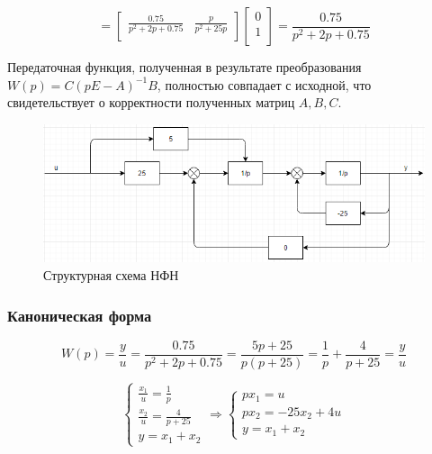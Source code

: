 \documentclass[14pt,a4paper,report]{report}
\begin{document}
\begin{equation*}
\text{$=\begin{bmatrix}
\frac{0.75}{p^2+2p+0.75} & \frac{p}{p^2+25p} \\
\end{bmatrix}\begin{bmatrix}
0\\
1 \\
\end{bmatrix}=\frac{0.75}{p^2+2p+0.75}
$}
\end{equation*}

Передаточная функция, полученная в результате преобразования $W(p)=C(pE-A)^{-1}B$, полностью совпадает с исходной, что свидетельствует о корректности полученных матриц  $A, B, C$. 


\begin{figure}[h!]
	\centering
	\includegraphics[scale = 0.9]{images/nfn.png}
	\caption{Структурная схема НФН}
	\label{image:2}
\end{figure}
\newpage
\subsubsection{Каноническая форма}

\begin{equation*}
\text{$W(p)=\frac{y}{u}=\frac{0.75}{p^2+2p+0.75}=\frac{5p+25}{p(p+25)}=\frac{1}{p}+\frac{4}{p+25}=\frac{y}{u}$}
\end{equation*}

\begin{equation*}
\begin{cases}
	\text{$\frac{x_1}{u}=\frac{1}{p}$} \\
	\text{$\frac{x_2}{u}=\frac{4}{p+25}$} \\
	\text{$y=x_1+x_2$}
\end{cases}
\Longrightarrow
\begin{cases}
\text{$px_1=u$} \\
\text{$px_2=-25x_2+4u$} \\
\text{$y=x_1+x_2$}
\end{cases}
\end{equation*}
\end{document}
